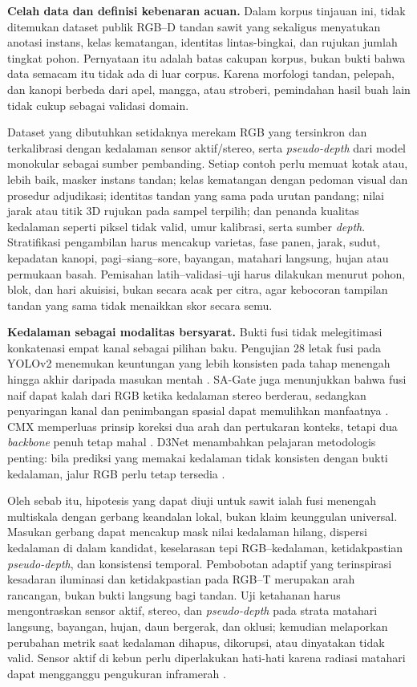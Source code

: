 \textbf{Celah data dan definisi kebenaran acuan.} Dalam korpus tinjauan ini,
tidak ditemukan dataset publik RGB--D tandan sawit yang sekaligus menyatukan
anotasi instans, kelas kematangan, identitas lintas-bingkai, dan rujukan
jumlah tingkat pohon. Pernyataan itu adalah batas cakupan korpus, bukan bukti
bahwa data semacam itu tidak ada di luar corpus. Karena morfologi tandan,
pelepah, dan kanopi berbeda dari apel, mangga, atau stroberi, pemindahan hasil
buah lain tidak cukup sebagai validasi domain.

Dataset yang dibutuhkan setidaknya merekam RGB yang tersinkron dan terkalibrasi
dengan kedalaman sensor aktif/stereo, serta \textit{pseudo-depth} dari model
monokular sebagai sumber pembanding. Setiap contoh perlu memuat kotak atau,
lebih baik, masker instans tandan; kelas kematangan dengan pedoman visual dan
prosedur adjudikasi; identitas tandan yang sama pada urutan pandang; nilai
jarak atau titik 3D rujukan pada sampel terpilih; dan penanda kualitas kedalaman
seperti piksel tidak valid, umur kalibrasi, serta sumber \textit{depth}.
Stratifikasi pengambilan harus mencakup varietas, fase panen, jarak, sudut,
kepadatan kanopi, pagi--siang--sore, bayangan, matahari langsung, hujan atau
permukaan basah. Pemisahan latih--validasi--uji harus dilakukan menurut pohon,
blok, dan hari akuisisi, bukan secara acak per citra, agar kebocoran tampilan
tandan yang sama tidak menaikkan skor secara semu.

\textbf{Kedalaman sebagai modalitas bersyarat.} Bukti fusi tidak melegitimasi
konkatenasi empat kanal sebagai pilihan baku. Pengujian 28 letak fusi pada
YOLOv2 menemukan keuntungan yang lebih konsisten pada tahap menengah hingga
akhir daripada masukan mentah \cite{ophoff2019multimodal}. SA-Gate juga
menunjukkan bahwa fusi naif dapat kalah dari RGB ketika kedalaman stereo
berderau, sedangkan penyaringan kanal dan penimbangan spasial dapat memulihkan
manfaatnya \cite{chen2020sagate}. CMX memperluas prinsip koreksi dua arah dan
pertukaran konteks, tetapi dua \textit{backbone} penuh tetap mahal
\cite{zhang2023cmx}. D3Net menambahkan pelajaran metodologis penting: bila
prediksi yang memakai kedalaman tidak konsisten dengan bukti kedalaman,
jalur RGB perlu tetap tersedia \cite{fan2020d3net}.

Oleh sebab itu, hipotesis yang dapat diuji untuk sawit ialah fusi menengah
multiskala dengan gerbang keandalan lokal, bukan klaim keunggulan universal.
Masukan gerbang dapat mencakup mask nilai kedalaman hilang, dispersi kedalaman
di dalam kandidat, keselarasan tepi RGB--kedalaman, ketidakpastian
\textit{pseudo-depth}, dan konsistensi temporal. Pembobotan adaptif yang
terinspirasi kesadaran iluminasi dan ketidakpastian pada RGB--T
\cite{li2019illumination,kim2022cmpd} merupakan arah rancangan, bukan bukti
langsung bagi tandan. Uji ketahanan harus mengontraskan sensor aktif, stereo,
dan \textit{pseudo-depth} pada strata matahari langsung, bayangan, hujan,
daun bergerak, dan oklusi; kemudian melaporkan perubahan metrik saat
kedalaman dihapus, dikorupsi, atau dinyatakan tidak valid. Sensor aktif di
kebun perlu diperlakukan hati-hati karena radiasi matahari dapat mengganggu
pengukuran inframerah \cite{genemola2020fruit3d}.

